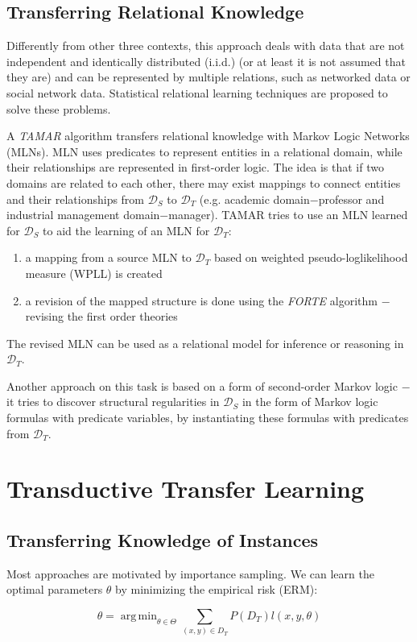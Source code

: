 \documentclass[a4paper,twocolumn]{article}
\newcommand{\D}{\mathcal{D}}
\DeclareMathOperator*{\argmin}{arg\,min}
\begin{document}
\subsection{Transferring Relational Knowledge}
Differently from other three contexts, this approach deals with data that are not independent and identically distributed (i.i.d.) (or at least it is not assumed that they are) and can be represented by multiple relations, such as networked data or social network data. Statistical relational learning techniques are proposed to solve these problems.

A \textit{TAMAR} algorithm transfers relational knowledge with Markov Logic Networks (MLNs). MLN uses predicates to represent entities in a relational domain, while their relationships are represented in first-order logic. The idea is that if two domains are related to each other, there may exist mappings to connect entities and their relationships from $\D_S$ to $\D_T$ (e.g. academic domain$-$professor and industrial management domain$-$manager). TAMAR tries to use an MLN learned for $\D_S$ to aid the learning of an MLN for $\D_T$:
\begin{enumerate}
    \item a mapping from a source MLN to $\D_T$ based on weighted pseudo-loglikelihood measure (WPLL) is created
    \item a revision of the mapped structure is done using the \textit{FORTE} algorithm $-$ revising the first order theories
\end{enumerate}
The revised MLN can be used as a relational model for inference or reasoning in $\D_T$.

Another approach on this task is based on a form of second-order Markov logic $-$ it tries to discover structural regularities in $\D_S$ in the form of Markov logic formulas with predicate variables, by instantiating these formulas with predicates from $\D_T$.

\section{Transductive Transfer Learning}
\subsection{Transferring Knowledge of Instances}
Most approaches are motivated by importance sampling. We can learn the optimal parameters $\theta$ by minimizing the empirical risk (ERM):

\begin{equation}
    \theta = \argmin_{\theta \in \Theta} \sum_{(x,y) \in D_T} P(D_T)l(x, y, \theta)
\end{equation}
\end{document}
